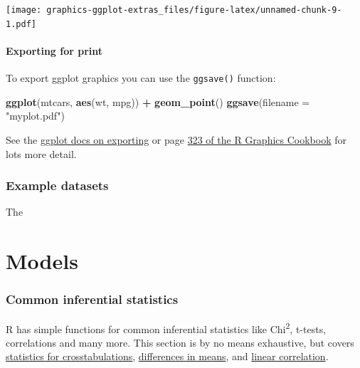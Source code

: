 \documentclass[]{article}
\newenvironment{Shaded}{\begin{snugshade}}{\end{snugshade}}
\newcommand{\KeywordTok}[1]{\textcolor[rgb]{0.13,0.29,0.53}{\textbf{#1}}}
\newcommand{\DataTypeTok}[1]{\textcolor[rgb]{0.13,0.29,0.53}{#1}}
\newcommand{\StringTok}[1]{\textcolor[rgb]{0.31,0.60,0.02}{#1}}
\newcommand{\OperatorTok}[1]{\textcolor[rgb]{0.81,0.36,0.00}{\textbf{#1}}}
\newcommand{\NormalTok}[1]{#1}
\theoremstyle{definition}
\theoremstyle{definition}
\theoremstyle{definition}
\theoremstyle{remark}
\begin{document}
\texttt{[image: graphics-ggplot-extras\_files/figure-latex/unnamed-chunk-9-1.pdf]}

\subsection*{Exporting for print}\label{exporting-graphics}

To export ggplot graphics you can use the \texttt{ggsave()} function:

\begin{Shaded}
\begin{Highlighting}[]

\KeywordTok{ggplot}\NormalTok{(mtcars, }\KeywordTok{aes}\NormalTok{(wt, mpg)) }\OperatorTok{+}\StringTok{ }\KeywordTok{geom_point}\NormalTok{()}
\KeywordTok{ggsave}\NormalTok{(}\DataTypeTok{filename =} \StringTok{"myplot.pdf"}\NormalTok{)}
\end{Highlighting}
\end{Shaded}

See the \href{http://ggplot2.tidyverse.org/reference/ggsave.html}{ggplot
docs on exporting} or page
\href{https://ase.tufts.edu/bugs/guide/assets/R\%20Graphics\%20Cookbook.pdf}{323
of the R Graphics Cookbook} for lots more detail.

\section{Example datasets}\label{example-datasets}

The

\part{Models}\label{part-models}

\hypertarget{common-inferential-stats}{\section{Common inferential
statistics}\label{common-inferential-stats}}

R has simple functions for common inferential statistics like
Chi\textsuperscript{2}, t-tests, correlations and many more. This
section is by no means exhaustive, but covers
\protect\hyperlink{crosstabs}{statistics for crosstabulations},
\protect\hyperlink{t-tests}{differences in means}, and
\protect\hyperlink{correlations}{linear correlation}.
\end{document}
